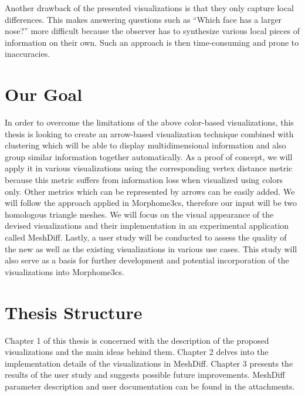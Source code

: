 
Another drawback of the presented visualizations is that they only capture local differences. This makes answering questions such as ``Which face has a larger nose?'' more difficult because the observer has to synthesize various local pieces of information on their own. Such an approach is then time-consuming and prone to inaccuracies.
\section*{Our Goal}

In order to overcome the limitations of the above color-based visualizations, this thesis is looking to create an arrow-based visualization technique combined with clustering which will be able to display multidimensional information and also group similar information together automatically. As a proof of concept, we will apply it in various visualizations using the corresponding vertex distance metric because this metric suffers from information loss when visualized using colors only. Other metrics which can be represented by arrows can be easily added. We will follow the approach applied in Morphome3cs, therefore our input will be two homologous triangle meshes. We will focus on the visual appearance of the devised visualizations and their implementation in an experimental application called MeshDiff. Lastly, a user study will be conducted to assess the quality of the new as well as the existing visualizations in various use cases. This study will also serve as a basis for further development and potential incorporation of the visualizations into Morphome3cs.
\section*{Thesis Structure}

Chapter 1 of this thesis is concerned with the description of the proposed visualizations and the main ideas behind them. Chapter 2 delves into the implementation details of the visualizations in MeshDiff. Chapter 3 presents the results of the user study and suggests possible future improvements. MeshDiff parameter description and user documentation can be found in the attachments.